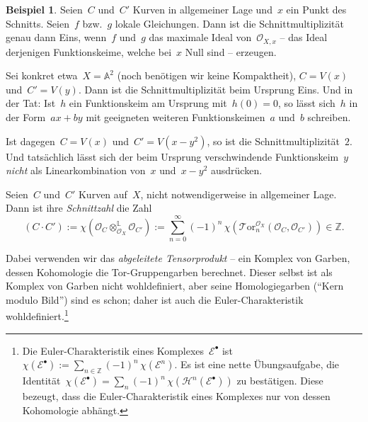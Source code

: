 \documentclass[a4paper,ngerman,12pt]{scrartcl}
\theoremstyle{definition}
\newtheorem{ex}[defn]{Beispiel}
\theoremstyle{plain}
\theoremstyle{remark}
\renewcommand{\AA}{\mathbb{A}}
\newcommand{\ZZ}{\mathbb{Z}}
\newcommand{\E}{\mathcal{E}}
\renewcommand{\H}{\mathcal{H}}
\renewcommand{\O}{\mathcal{O}}
\begin{document}
\begin{ex}Seien~$C$ und~$C'$ Kurven in allgemeiner Lage und~$x$ ein Punkt des
Schnitts. Seien~$f$ bzw.~$g$ lokale Gleichungen. Dann ist die
Schnittmultiplizität genau dann Eins, wenn~$f$ und~$g$ das maximale Ideal
von~$\O_{X,x}$ -- das Ideal derjenigen Funktionskeime, welche bei~$x$
Null sind -- erzeugen.

Sei konkret etwa~$X = \AA^2$ (noch benötigen wir keine
Kompaktheit), $C = V(x)$ und~$C' = V(y)$. Dann ist die Schnittmultiplizität
beim Ursprung Eins. Und in der Tat: Ist~$h$ ein Funktionskeim am
Ursprung mit~$h(0) = 0$, so lässt sich~$h$ in der Form~$ax + by$ mit geeigneten
weiteren Funktionskeimen~$a$ und~$b$ schreiben.

Ist dagegen~$C = V(x)$ und~$C' = V(x - y^2)$, so ist die
Schnittmultiplizität~$2$. Und tatsächlich lässt sich der beim Ursprung
verschwindende Funktionskeim~$y$ \emph{nicht} als Linearkombination von~$x$
und~$x-y^2$ ausdrücken.
\end{ex}

\begin{defn}Seien~$C$ und~$C'$ Kurven auf~$X$, nicht notwendigerweise in
allgemeiner Lage. Dann ist ihre \emph{Schnittzahl} die Zahl
\[ (C \cdot C') := \chi(\O_C \otimes_{\O_X}^{\mathbb{L}} \O_{C'}) :=
  \sum_{n = 0}^\infty (-1)^n \, \chi(\mathcal{T}\!\mathrm{or}^{\O_X}_n(\O_C,\O_{C'})) \in \ZZ. \]
\end{defn}

Dabei verwenden wir das \emph{abgeleitete Tensorprodukt} -- ein Komplex von
Garben, dessen Kohomologie die Tor-Gruppengarben berechnet. Dieser selbst ist als
Komplex von Garben nicht wohldefiniert, aber seine Homologiegarben ("`Kern
modulo Bild"') sind es schon; daher ist auch die Euler-Charakteristik
wohldefiniert.\footnote{Die Euler-Charakteristik eines Komplexes~$\E^\bullet$
ist~$\chi(\E^\bullet) := \sum_{n \in \ZZ} (-1)^n \,\chi(\E^n)$. Es ist eine
nette Übungsaufgabe, die Identität~$\chi(\E^\bullet) = \sum_n (-1)^n
\,\chi(\H^n(\E^\bullet))$ zu bestätigen. Diese bezeugt, dass die
Euler-Charakteristik eines Komplexes nur von dessen Kohomologie abhängt.}
\end{document}
